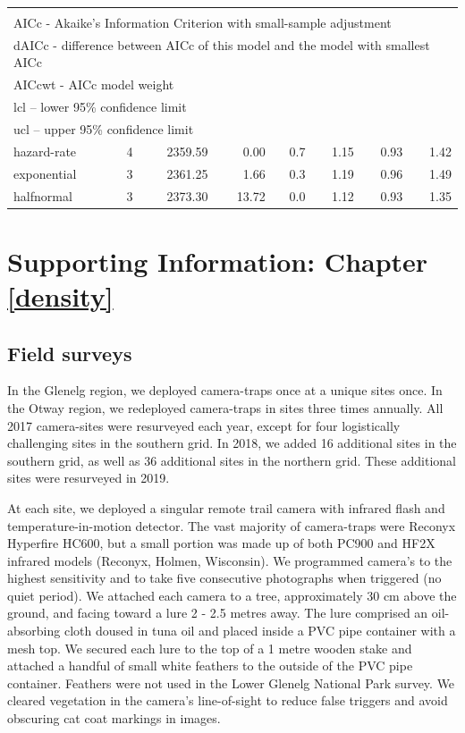 \documentclass[11pt,a4paper,titlepage,twoside,openright]{style/unimelbthesis}
\begin{document}
\begin{mainmatter}
\begin{longtable}[t]{lrrrrrrr}
\endfoot
\bottomrule
\multicolumn{8}{l}{\rule{0pt}{1em}K - number of parameters}\\
\multicolumn{8}{l}{\rule{0pt}{1em}AICc - Akaike's Information Criterion with small-sample adjustment}\\
\multicolumn{8}{l}{\rule{0pt}{1em}dAICc - difference between AICc of this model and the model with smallest AICc}\\
\multicolumn{8}{l}{\rule{0pt}{1em}AICcwt - AICc model weight}\\
\multicolumn{8}{l}{\rule{0pt}{1em}lcl – lower 95\% confidence limit}\\
\multicolumn{8}{l}{\rule{0pt}{1em}ucl – upper 95\% confidence limit}\\
\endlastfoot
hazard-rate & 4 & 2359.59 & 0.00 & 0.7 & 1.15 & 0.93 & 1.42\\
exponential & 3 & 2361.25 & 1.66 & 0.3 & 1.19 & 0.96 & 1.49\\
halfnormal & 3 & 2373.30 & 13.72 & 0.0 & 1.12 & 0.93 & 1.35\\*
\end{longtable}
\endgroup{}

\hypertarget{density-app}{%
\chapter{Supporting Information: Chapter \ref{density}}\label{density-app}}

\newpage

\hypertarget{density-app-field}{%
\section{Field surveys}\label{density-app-field}}

In the Glenelg region, we deployed camera-traps once at a unique sites once. In the Otway region, we redeployed camera-traps in sites three times annually. All 2017 camera-sites were resurveyed each year, except for four logistically challenging sites in the southern grid. In 2018, we added 16 additional sites in the southern grid, as well as 36 additional sites in the northern grid. These additional sites were resurveyed in 2019.

At each site, we deployed a singular remote trail camera with infrared flash and temperature-in-motion detector. The vast majority of camera-traps were Reconyx Hyperfire HC600, but a small portion was made up of both PC900 and HF2X infrared models (Reconyx, Holmen, Wisconsin). We programmed camera's to the highest sensitivity and to take five consecutive photographs when triggered (no quiet period). We attached each camera to a tree, approximately 30 cm above the ground, and facing toward a lure 2 - 2.5 metres away. The lure comprised an oil-absorbing cloth doused in tuna oil and placed inside a PVC pipe container with a mesh top. We secured each lure to the top of a 1 metre wooden stake and attached a handful of small white feathers to the outside of the PVC pipe container. Feathers were not used in the Lower Glenelg National Park survey. We cleared vegetation in the camera's line-of-sight to reduce false triggers and avoid obscuring cat coat markings in images.


\end{mainmatter}
\end{document}
